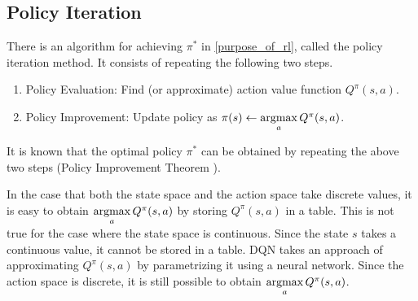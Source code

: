 \documentclass[english, dvipdfmx]{ampmt}             %
\newcommand{\argmax}{\mathop{\rm argmax}\limits}
\begin{document}
\subsection{Policy Iteration}
\label{sec:policy_improvement}
There is an algorithm for achieving $\pi^{*}$ in \eqref{purpose_of_rl}, called the policy iteration method. It consists of repeating the following two steps.
\begin{enumerate}
	\item Policy Evaluation: Find (or approximate) action value function $Q^{\pi}(s,a)$.
	\item Policy Improvement: Update policy as $\pi(s)\gets\argmax_aQ^{\pi}(s,a)$.
\end{enumerate}
It is known that the optimal policy $\pi^{*}$ can be obtained by repeating the above two steps (Policy Improvement Theorem \cite{RL}).\par
In the case that both the state space and the action space take discrete values, it is easy to obtain
$\argmax_aQ^{\pi}(s,a)$ by storing $Q^{\pi}(s,a)$ in a table. This is not true for the case where the state space is continuous. Since the state $s$ takes a continuous value, it cannot be stored in a table. DQN \cite{DQN} takes an approach of approximating $Q^{\pi}(s,a)$ by parametrizing it using a neural network. Since the action space is discrete, it is still possible to obtain $\argmax_aQ^{\pi}(s,a)$. \par
\end{document}
